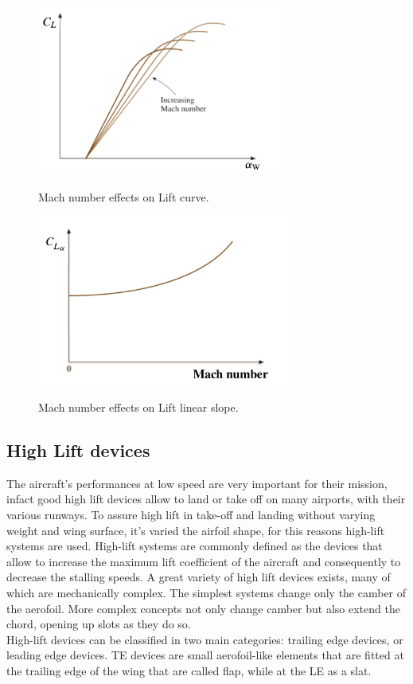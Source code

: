 \begin{figure}[H]
\centering
{\includegraphics[height=5.6cm]{Immagini/clamach}} 
\caption{Mach number effects on Lift curve.}
\label{fig:clalfawing}
\end{figure}

\begin{figure}[H]
\centering
{\includegraphics[height=5.6cm]{Immagini/declmach.png}} 
\caption{Mach number effects on Lift linear slope.}
\label{fig:clalfawingslope}
\end{figure}

\subsection{High Lift devices}
The aircraft’s performances at low speed are very important for their mission, infact good high lift devices allow to land or take off on many airports, with their various runways.\cite{adas}
To assure high lift in take-off and landing without varying weight and wing surface, it's varied the airfoil shape, for this reasons high-lift systems are used. High-lift systems are commonly defined as the devices that allow to increase the maximum lift coefficient of the aircraft and consequently to decrease the stalling speeds. 
A great variety of high lift devices exists, many of which are mechanically complex. The simplest systems change only the camber of the aerofoil. More complex concepts not only change camber but also extend the chord, opening up slots as they do so. \cite{howe2000aircraft}\\
High-lift devices can be classified in two main categories: trailing edge devices, or leading edge devices.
TE devices are small aerofoil-like elements that are fitted at the trailing edge of the wing that are called flap, while  at the LE as a slat.


